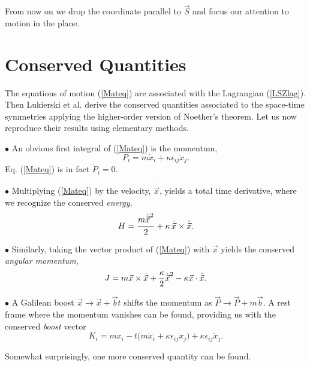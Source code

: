 \documentclass[a4paper,11pt]{article}
\let\ssection=\section
\renewcommand{\section}{\setcounter{equation}{0}\ssection}
\newcommand{\vx}{{\vec x}}
\def\vb{{\vec b}}
\def\vP{{\vec P}}
\def\vS{\vec{S}}
\def\vx{{\vec x}}
\begin{document}
 From now on we drop the coordinate parallel to
$\vS$ and focus our attention to motion in the plane.


\section{Conserved Quantities}


The equations of motion (\ref{Mateq}) are associated with
the Lagrangian (\ref{LSZlag}).
Then Lukierski et al. derive the conserved quantities
associated to the space-time symmetries
applying the higher-order version of Noether's theorem.
Let us now reproduce their results using elementary methods.

$\bullet$
An obvious first integral of (\ref{Mateq}) is the momentum,
\begin{equation}
     P_{i}=m\dot{x}_{i}+\kappa\epsilon_{ij}\ddot{x}_{j}.
     \label{momentum}
\end{equation}
Eq. (\ref{Mateq}) is in fact $\dot{P}_{i}=0$.

$\bullet$ Multiplying (\ref{Mateq}) by the velocity,
$\dot{\vx}$, yields a total time derivative, where we recognize the
conserved {\it energy},
\begin{equation}
     H=\frac{m\dot{\vx}\strut^2}{2}+\kappa\,\dot{\vx}\times\ddot{\vx}.
     \label{energy}
\end{equation}

$\bullet$ Similarly, taking the vector product of
(\ref{Mateq}) with $\vx$ yields the conserved {\it angular momentum},
\begin{equation}
     J=m\vx\times\dot{\vx}+\frac{\kappa}{2}\dot{\vx}\strut^2
     -\kappa\vx\cdot\ddot{\vx}.
     \label{angmom}
\end{equation}

$\bullet$ A Galilean boost $\vx\to\vx+\vb t$ shifts the momentum
as $\vP\to\vP+m\vb$. A rest frame where the momentum vanishes can
be found, providing us with the conserved {\it boost} vector
\begin{equation}
     K_{i}=mx_{i}-t\big(m\dot{x}_{i}+\kappa\epsilon_{ij}\ddot{x}_{j}\big)
     +\kappa\epsilon_{ij}\dot{x}_{j}.
     \label{CM}
\end{equation}

Somewhat surprisingly, one more conserved quantity can be found.
\end{document}

